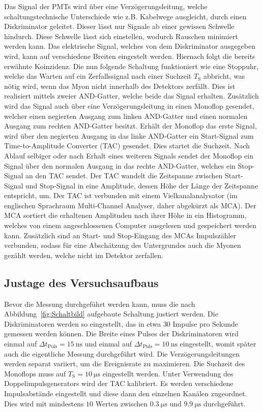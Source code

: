 \noindent
Das Signal der PMTs wird über eine Verzögerungsleitung, welche schaltungstechnische Unterschiede
wie z.B. Kabelwege ausgleicht, durch einen Diskriminator geleitet. Dieser lässt nur Signale ab
einer gewissen Schwelle hindurch. Diese Schwelle lässt sich einstellen, wodurch Rauschen
minimiert werden kann. Das elektrische Signal, welches von dem Diskriminator ausgegeben wird,
kann auf verschiedene Breiten eingestelt werden. Hiernach folgt die bereits erwähnte Koinzidenz.
Die nun folgende Schaltung funktioniert wie eine Stoppuhr, welche das Warten auf ein Zerfallssignal
nach einer Suchzeit $T_{\text{S}}$ abbricht, was nötig wird, wenn das Myon nicht innerhalb des Detektors
zerfällt. Dies ist realisiert mittels zweier AND-Gatter, welche beide das Signal erhalten. Zusätzlich
wird das Signal auch über eine Verzögerungsleitung in einen Monoflop gesendet, welcher einen negierten
Ausgang zum linken AND-Gatter und einen normalen Ausgang zum rechten AND-Gatter besitzt. Erhält der
Monoflop das erste Signal, wird über den negierten Ausgang in das linke AND-Gatter ein Start-Signal zum
Time-to-Amplitude Converter (TAC) gesendet. Dies startet die Suchzeit. Nach Ablauf selbiger oder
nach Erhalt eines weiteren Signals sendet der Monoflop ein Signal über den normalen Ausgang in
das rechte AND-Gatter, welches ein Stop-Signal an den TAC sendet.
Der TAC wandelt die Zeitspanne zwischen Start-Signal und Stop-Signal in eine Amplitude, dessen Höhe der
Länge der Zeitspanne entspricht, um.
Der TAC ist verbunden mit einem Vielkanalanalysator (im englischen Sprachraum Multi-Channel Analyser, daher abgekürzt als MCA).
Der MCA sortiert die erhaltenen Amplituden nach ihrer Höhe in ein Histogramm, welches von einem
angeschlossenen Computer ausgelesen und gespeichert werden kann.
Zusätzlich sind an Start- und Stop-Eingang des MCAs Impulszähler verbunden, sodass für eine Abschätzung
des Untergrundes auch die Myonen gezählt werden, welche nicht im Detektor zerfallen.
\subsection{Justage des Versuchsaufbaus}
\label{JustageVersuchsaufbau}
Bevor die Messung durchgeführt werden kann, muss die nach Abbildung~\ref{fig:Schaltbild} aufgebaute Schaltung justiert
werden. Die Diskriminatoren werden so eingestellt, das in etwa $30$ Impulse pro Sekunde gemessen werden können.
Die Breite eines Pulses der Diskriminatoren wird einmal auf $\Delta t_\text{Puls} = \SI{15}{\nano\second}$ und einmal auf $\Delta t_\text{Puls} = \SI{10}{\nano\second}$
eingestellt, womit später auch die eigentliche Messung durchgeführt wird. Die Verzögerungsleitungen werden separat
variiert, um die Ereignisrate zu maximieren. Die Suchzeit des Monoflops muss auf $T_{\text{S}} = \SI{10}{\micro\second} $ eingestellt werden.
Unter Verwendung des Doppelimpulsgenerators wird der TAC kalibriert. Es werden verschiedene Impulsabstände eingestellt
und diese dann den einzelnen Kanälen zugeordnet. Dies wird mit mindestens $10$ Werten zwischen $\SI{0.3}{\micro\second}$
und $\SI{9.9}{\micro\second}$ durchgeführt.
